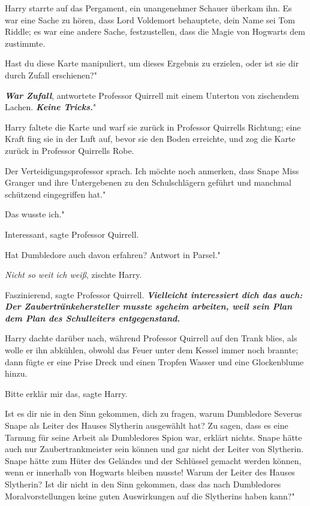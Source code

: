 Harry starrte auf das Pergament, ein unangenehmer Schauer überkam ihn. Es war
eine Sache zu hören, dass Lord Voldemort behauptete, dein Name sei Tom Riddle;
es war eine andere Sache, festzustellen, dass die Magie von Hogwarts dem
zustimmte.

\glqq{}Hast du diese Karte manipuliert, um dieses Ergebnis zu erzielen, oder ist
sie dir durch Zufall erschienen?"

\glqq{}\textbf{\emph{War Zufall}}\grqq{}, antwortete Professor Quirrell mit einem
Unterton von zischendem Lachen. \glqq{}\textbf{\emph{Keine Tricks.}}"

Harry faltete die Karte und warf sie zurück in Professor Quirrells Richtung;
eine Kraft fing sie in der Luft auf, bevor sie den Boden erreichte, und zog die
Karte zurück in Professor Quirrells Robe.

Der Verteidigungsprofessor sprach. \glqq{}Ich möchte noch anmerken, dass Snape
Miss Granger und ihre Untergebenen zu den Schulschlägern geführt und manchmal
schützend eingegriffen hat."

\glqq{}Das wusste ich."

\glqq{}Interessant\grqq{}, sagte Professor Quirrell.

\glqq{}Hat Dumbledore auch davon erfahren? Antwort in Parsel."

\glqq{}\emph{Nicht so weit ich weiß}\grqq{}, zischte Harry.

\glqq{}Faszinierend\grqq{}, sagte Professor Quirrell. \glqq
\textbf{\emph{Vielleicht interessiert dich das auch: Der Zaubertränkehersteller
musste sgeheim arbeiten, weil sein Plan dem Plan des Schulleiters
entgegenstand.\grqq{}} }

Harry dachte darüber nach, während Professor Quirrell auf den Trank blies, als
wolle er ihn abkühlen, obwohl das Feuer unter dem Kessel immer noch brannte;
dann fügte er eine Prise Dreck und einen Tropfen Wasser und eine Glockenblume
hinzu.

\glqq{}Bitte erklär mir das\grqq{}, sagte Harry.

\glqq{}Ist es dir nie in den Sinn gekommen, dich zu fragen, warum Dumbledore
Severus Snape als Leiter des Hauses Slytherin ausgewählt hat? Zu sagen, dass es
eine Tarnung für seine Arbeit als Dumbledores Spion war, erklärt nichts. Snape
hätte auch nur Zaubertrankmeister sein können und gar nicht der Leiter von
Slytherin. Snape hätte zum Hüter des Geländes und der Schlüssel gemacht werden
können, wenn er innerhalb von Hogwarts bleiben musste! Warum der Leiter des
Hauses Slytherin? Ist dir nicht in den Sinn gekommen, dass das nach Dumbledores
Moralvorstellungen keine guten Auswirkungen auf die Slytherins haben kann?"

